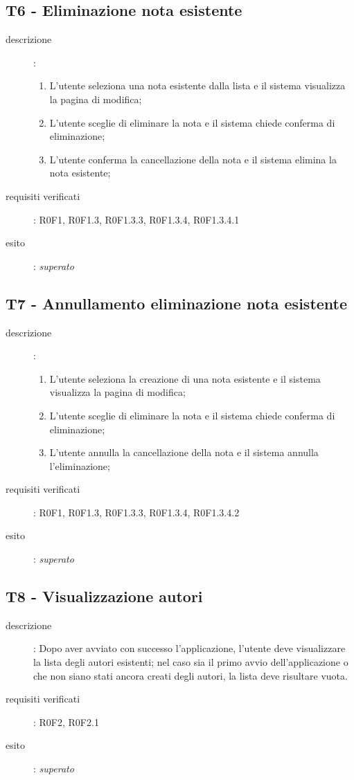 \subsection{T6 - Eliminazione nota esistente}
\begin{description}
\item[descrizione]: \hfill
	\begin{enumerate}
	\item L'utente seleziona una nota esistente dalla lista e il sistema visualizza la pagina di modifica;
	\item L'utente sceglie di eliminare la nota e il sistema chiede conferma di eliminazione;
	\item L'utente conferma la cancellazione della nota e il sistema elimina la nota esistente;
	\end{enumerate}
\item[requisiti verificati]: R0F1, R0F1.3, R0F1.3.3, R0F1.3.4, R0F1.3.4.1
\item[esito]: \emph{superato}
\end{description}

\subsection{T7 - Annullamento eliminazione nota esistente}
\begin{description}
\item[descrizione]: \hfill
	\begin{enumerate}
	\item L'utente seleziona la creazione di una nota esistente e il sistema visualizza la pagina di modifica;
	\item L'utente sceglie di eliminare la nota e il sistema chiede conferma di eliminazione;
	\item L'utente annulla la cancellazione della nota e il sistema annulla l'eliminazione;
	\end{enumerate}
\item[requisiti verificati]: R0F1, R0F1.3, R0F1.3.3, R0F1.3.4, R0F1.3.4.2
\item[esito]: \emph{superato}
\end{description}

\subsection{T8 - Visualizzazione autori}
\begin{description}
\item[descrizione]: Dopo aver avviato con successo l'applicazione, l'utente deve visualizzare la lista degli autori esistenti; nel caso sia il primo avvio dell'applicazione o che non siano stati ancora creati degli autori, la lista deve risultare vuota.
\item[requisiti verificati]: R0F2, R0F2.1
\item[esito]: \emph{superato}
\end{description}

